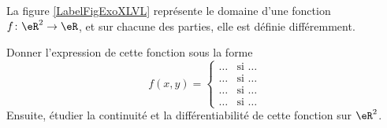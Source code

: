 
\begin{exercice}\label{exo0045}

La figure \ref{LabelFigExoXLVL} représente le domaine d'une fonction $f\colon \eR^2\to \eR$, et sur chacune des parties, elle est définie différemment.
\newcommand{\CaptionFigExoXLVL}{La fonction de l'exercice \ref{exo0045}.}


Donner l'expression de cette fonction sous la forme
\begin{equation}
	f(x,y)=\begin{cases}
	\ldots	&	 \text{si \ldots}\\
	\ldots	&	 \text{si \ldots}\\
	\ldots	&	 \text{si \ldots}\\
	\ldots	&	 \text{si \ldots}
\end{cases}
\end{equation}
Ensuite, étudier la continuité et la différentiabilité de cette fonction sur $\eR^2$.

\end{exercice}
